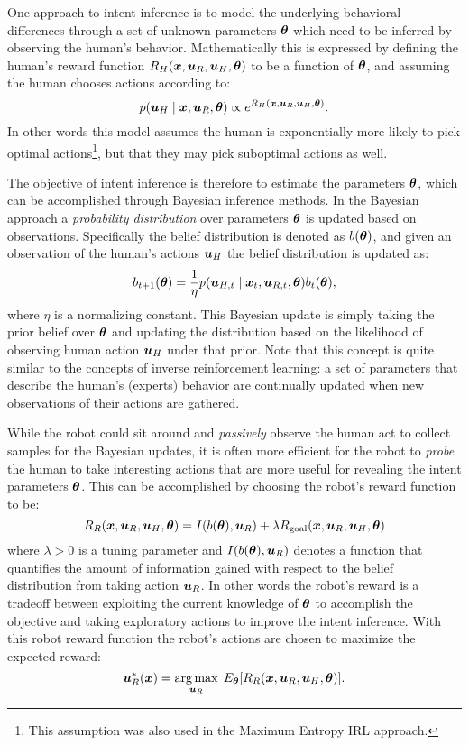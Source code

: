 One approach to intent inference\cite{SadighLandolfiEtAl2018} is to model the underlying behavioral differences through a set of unknown parameters $\bm{\theta}$ which need to be inferred by observing the human's behavior. Mathematically this is expressed by defining the human's reward function $R_H(\bm{x}, \bm{u}_R, \bm{u}_H, \bm{\theta})$ to be a function of $\bm{\theta}$, and assuming the human chooses actions according to:
\begin{equation*}
p(\bm{u}_H \mid \bm{x}, \bm{u}_R, \bm{\theta}) \propto e^{R_H(\bm{x}, \bm{u}_R, \bm{u}_H, \bm{\theta})}.
\end{equation*}
In other words this model assumes the human is exponentially more likely to pick optimal actions\footnote{This assumption was also used in the Maximum Entropy IRL approach.}, but that they may pick suboptimal actions as well.

The objective of intent inference is therefore to estimate the parameters $\bm{\theta}$, which can be accomplished through Bayesian inference methods. In the Bayesian approach a \textit{probability distribution} over parameters $\bm{\theta}$ is updated based on observations. Specifically the belief distribution is denoted as $b(\bm{\theta})$, and given an observation of the human's actions $\bm{u}_H$ the belief distribution is updated as:
\begin{equation*}
b_{t+1}(\bm{\theta}) = \frac{1}{\eta}p(\bm{u}_{H,t} \mid \bm{x}_t, \bm{u}_{R,t}, \bm{\theta})b_t(\bm{\theta}),
\end{equation*}
where $\eta$ is a normalizing constant. This Bayesian update is simply taking the prior belief over $\bm{\theta}$ and updating the distribution based on the likelihood of observing human action $\bm{u}_H$ under that prior. Note that this concept is quite similar to the concepts of inverse reinforcement learning: a set of parameters that describe the human's (experts) behavior are continually updated when new observations of their actions are gathered.

While the robot could sit around and \textit{passively} observe the human act to collect samples for the Bayesian updates, it is often more efficient for the robot to \textit{probe} the human to take interesting actions that are more useful for revealing the intent parameters $\bm{\theta}$. This can be accomplished by choosing the robot's reward function to be:
\begin{equation*}
R_R(\bm{x}, \bm{u}_R, \bm{u}_H, \bm{\theta}) = I(b(\bm{\theta}), \bm{u}_R) + \lambda R_{\text{goal}}(\bm{x}, \bm{u}_R, \bm{u}_H, \bm{\theta})
\end{equation*}
where $\lambda>0$ is a tuning parameter and $I(b(\bm{\theta}), \bm{u}_R)$ denotes a function that quantifies the amount of information gained with respect to the belief distribution from taking action $\bm{u}_R$. In other words the robot's reward is a tradeoff between exploiting the current knowledge of $\bm{\theta}$ to accomplish the objective and taking exploratory actions to improve the intent inference. With this robot reward function the robot's actions are chosen to maximize the expected reward:
\begin{equation*}
\bm{u}_R^*(\bm{x}) = \underset{\bm{u}_R}{\arg\max} \:\: E_{\bm{\theta}}[R_R(\bm{x}, \bm{u}_R, \bm{u}_H, \bm{\theta})].
\end{equation*}

